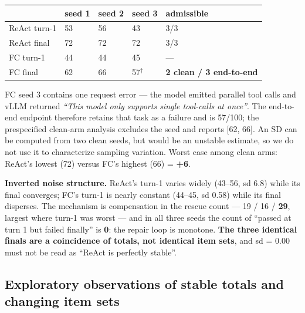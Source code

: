 \begin{center}
\begin{minipage}{\linewidth}
\centering
\small
{}\label{tab:variance}
\begin{tabular}{@{}lllll@{}}
\toprule
& seed 1 & seed 2 & seed 3 & admissible \\
\midrule
ReAct turn-1 & 53 & 56 & 43 & 3/3 \\
ReAct final & 72 & 72 & 72 & 3/3 \\
FC turn-1 & 44 & 44 & 45 & --- \\
FC final & 62 & 66 & 57$^{\dagger}$ & \textbf{2 clean / 3 end-to-end} \\
\bottomrule
\end{tabular}
\end{minipage}
\end{center}

FC seed 3 contains one request error --- the model emitted parallel tool calls and vLLM returned
\emph{``This model only supports single tool-calls at once''}. The end-to-end endpoint therefore
retains that task as a failure and is 57/100; the prespecified clean-arm analysis excludes the seed
and reports [62, 66]. An SD can be computed from two clean seeds, but would be an unstable estimate,
so we do not use it to characterize sampling variation. Worst case among clean arms: ReAct's
lowest (72) versus FC's highest (66) = \textbf{+6}.

\textbf{Inverted noise structure.} ReAct's turn-1 varies widely (43--56, sd 6.8) while its final
converges; FC's turn-1 is nearly constant (44--45, sd 0.58) while its final disperses. The
mechanism is compensation in the rescue count --- 19 / 16 / \textbf{29}, largest where turn-1 was
worst --- and in all three seeds the count of ``passed at turn 1 but failed finally'' is
\textbf{0}: the repair loop is monotone. \textbf{The three identical finals are a coincidence of
totals, not identical item sets}, and sd = 0.00 must not be read as ``ReAct is perfectly
stable''.

\subsection{Exploratory observations of stable totals and changing item sets}
\label{sec:composition}

